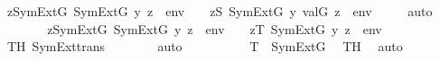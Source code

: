 \begin{isabellebody}
\ {\isachardoublequoteopen}{\isacharparenleft}{\kern0pt}{\isasymexists}z{\isasymin}SymExt{\isacharparenleft}{\kern0pt}G{\isacharparenright}{\kern0pt}{\isachardot}{\kern0pt}\ SymExt{\isacharparenleft}{\kern0pt}G{\isacharparenright}{\kern0pt}{\isacharcomma}{\kern0pt}\ {\isacharbrackleft}{\kern0pt}y{\isacharcomma}{\kern0pt}\ z{\isacharbrackright}{\kern0pt}\ {\isacharat}{\kern0pt}\ env\ {\isasymTurnstile}\ {\isasymphi}{\isacharparenright}{\kern0pt}\ {\isasymlongleftrightarrow}\ {\isacharparenleft}{\kern0pt}{\isasymexists}z{\isacharprime}{\kern0pt}{\isasymin}S{\isachardot}{\kern0pt}\ SymExt{\isacharparenleft}{\kern0pt}G{\isacharparenright}{\kern0pt}{\isacharcomma}{\kern0pt}\ {\isacharbrackleft}{\kern0pt}y{\isacharcomma}{\kern0pt}\ val{\isacharparenleft}{\kern0pt}G{\isacharcomma}{\kern0pt}\ z{\isacharprime}{\kern0pt}{\isacharparenright}{\kern0pt}{\isacharbrackright}{\kern0pt}\ {\isacharat}{\kern0pt}\ env\ {\isasymTurnstile}\ {\isasymphi}{\isacharparenright}{\kern0pt}\ {\isachardoublequoteclose}\ \isamarkupfalse%
\ auto\isanewline
\isanewline
\ \ \ \ \isamarkupfalse%
\ \isamarkupfalse%
\ {\isachardoublequoteopen}{\isacharparenleft}{\kern0pt}{\isasymexists}z{\isasymin}SymExt{\isacharparenleft}{\kern0pt}G{\isacharparenright}{\kern0pt}{\isachardot}{\kern0pt}\ SymExt{\isacharparenleft}{\kern0pt}G{\isacharparenright}{\kern0pt}{\isacharcomma}{\kern0pt}\ {\isacharbrackleft}{\kern0pt}y{\isacharcomma}{\kern0pt}\ z{\isacharbrackright}{\kern0pt}\ {\isacharat}{\kern0pt}\ env\ {\isasymTurnstile}\ {\isasymphi}{\isacharparenright}{\kern0pt}\ {\isasymlongleftrightarrow}\ {\isacharparenleft}{\kern0pt}{\isasymexists}z{\isasymin}T{\isachardot}{\kern0pt}\ SymExt{\isacharparenleft}{\kern0pt}G{\isacharparenright}{\kern0pt}{\isacharcomma}{\kern0pt}\ {\isacharbrackleft}{\kern0pt}y{\isacharcomma}{\kern0pt}\ z{\isacharbrackright}{\kern0pt}\ {\isacharat}{\kern0pt}\ env\ {\isasymTurnstile}\ {\isasymphi}{\isacharparenright}{\kern0pt}{\isachardoublequoteclose}\isanewline
\ \ \ \ \ \ \isamarkupfalse%
\ TH\ SymExt{\isacharunderscore}{\kern0pt}trans\isanewline
\ \ \ \ \ \ \isamarkupfalse%
\ auto\isanewline
\ \ \isamarkupfalse%
\ \isanewline
\ \ \ \ \isamarkupfalse%
\ {\isachardoublequoteopen}T\ {\isasymin}\ SymExt{\isacharparenleft}{\kern0pt}G{\isacharparenright}{\kern0pt}{\isachardoublequoteclose}\ \isamarkupfalse%
\ TH\ \isamarkupfalse%
\ auto\isanewline
\ \ \isamarkupfalse%
\isanewline
{}\isamarkupfalse%
%
\endisatagproof

\end{isabellebody}
